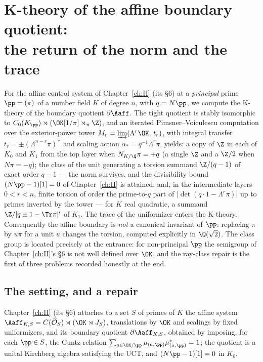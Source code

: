 \chapter[K-theory of the affine boundary quotient]{K-theory of the affine boundary quotient:\\ the return of the norm and the trace}\label{ch:XXX}
\renewcommand{\Ns}{N}
\begin{summary}
For the affine control system of Chapter~\ref{ch:II} (its \S6) at a \emph{principal} prime
$\pp=(\pi)$ of a number field $K$ of degree $n$, with $q=\Ns\pp$, we compute the K-theory
of the boundary quotient $\partial\Aaff$. The tight quotient is stably isomorphic to
$C_0(K_\pp)\rtimes(\OK[1/\pi]\rtimes_\pi\Z)$, and an iterated Pimsner--Voiculescu
computation over the exterior-power tower $M_r=\varinjlim(\Lambda^r\OK,\,t_r)$, with
integral transfer $t_r=\pm(\Lambda^{n-r}\pi)^\vee$ and scaling action
$\alpha_*=q^{-1}\Lambda^r\pi$, yields: a copy of $\Z$ in each of $K_0$ and $K_1$ from the
top layer when $\Ns_{K/\Q}\pi=+q$ (a single $\Z$ and a $\Z/2$ when $\Ns\pi=-q$); the class
of the unit generating a torsion summand $\Z/(q-1)$ of exact order $q-1$ --- the norm
survives, and the divisibility bound $(\Ns\pp-1)[1]=0$ of Chapter~\ref{ch:II} is attained; and, in the
intermediate layers $0<r<n$, finite torsion of order the prime-to-$q$ part of
$\bigl|\det(q\cdot1-\Lambda^r\pi)\bigr|$ up to primes inverted by the tower --- for $K$
real quadratic, a summand $\Z/|q\pm1-\Tr\pi|'$ of $K_1$. The trace of the uniformizer
enters the K-theory. Consequently the affine boundary is \emph{not} a canonical invariant
of $\pp$: replacing $\pi$ by $u\pi$ for a unit $u$ changes the torsion, computed explicitly
in $\Q(\sqrt2)$. The class group is located precisely at the entrance: for non-principal
$\pp$ the semigroup of Chapter~\ref{ch:II}'s \S6 is not well defined over $\OK$, and the ray-class
repair is the first of three problems recorded honestly at the end.
\end{summary}


\section{The setting, and a repair}\label{XXX:sec:setting}

Chapter~\ref{ch:II} (its \S6) attaches to a set $S$ of primes of $K$ the affine system
$\Aaff_{K,S}=C(\widehat{\mathcal O}_S)\rtimes(\OK\rtimes J_S)$, translations by $\OK$ and
scalings by fixed uniformizers, and its boundary quotient $\partial\Aaff_{K,S}$, obtained
by imposing, for each $\pp\in S$, the Cuntz relation
$\sum_{a\in\OK/\pp}\mu_{(a,\pp)}\mu_{(a,\pp)}^*=1$; the quotient is a unital Kirchberg
algebra satisfying the UCT, and $(\Ns\pp-1)[1]=0$ in $K_0$.

